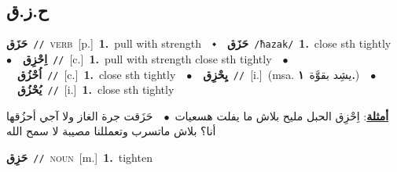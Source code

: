 \documentclass[10pt,a4paper,twoside]{article} %
\begin{document}
\begin{multicols}{2}
\vspace{-3mm}
\subsection*{\color{blue}\foreignlanguage{arabic}{ح.ز.ق}\color{blue}{}} 

{\setlength\topsep{0pt}\textbf{\foreignlanguage{arabic}{حَزَق}}\ {\color{gray}\texttt{//}\color{black}}\ \textsc{verb}\ [p.]\ \textbf{1.}~pull with strength\ \ $\smblkdiamond$\ \ \setlength\topsep{0pt}\textbf{\foreignlanguage{arabic}{حَزَق}}\ {\color{gray}\texttt{/ħazak/}\color{black}}\ \textbf{1.}~close sth tightly\ \ $\bullet$\ \ \setlength\topsep{0pt}\textbf{\foreignlanguage{arabic}{اِحْزِق}}\ {\color{gray}\texttt{//}\color{black}}\ [c.]\ \textbf{1.}~pull with strength close sth tightly\ \ $\bullet$\ \ \setlength\topsep{0pt}\textbf{\foreignlanguage{arabic}{اُحْزُق}}\ {\color{gray}\texttt{//}\color{black}}\ [c.]\ \textbf{1.}~close sth tightly\ \ $\bullet$\ \ \setlength\topsep{0pt}\textbf{\foreignlanguage{arabic}{يِحْزِق}}\ {\color{gray}\texttt{//}\color{black}}\ [i.]\ \color{gray}(msa. \foreignlanguage{arabic}{يشِد بقوَّة}~\foreignlanguage{arabic}{\textbf{١.}})\color{black}\ \ $\bullet$\ \ \setlength\topsep{0pt}\textbf{\foreignlanguage{arabic}{يُحْزُق}}\ {\color{gray}\texttt{//}\color{black}}\ [i.]\ \textbf{1.}~close sth tightly\  \begin{flushright}\color{gray}\foreignlanguage{arabic}{\textbf{\underline{\foreignlanguage{arabic}{أمثلة}}}: اِحْزِق الحبل مليح بلاش ما يفلت هسعيات\ $\bullet$\ \  حَزَقت جرة الغاز ولا آجي أحزُقها أنا؟ بلاش ماتسرب وتعمللنا مصيبة لا سمح الله}\end{flushright}\color{black}} \vspace{2mm}

{\setlength\topsep{0pt}\textbf{\foreignlanguage{arabic}{حَزِق}}\ {\color{gray}\texttt{//}\color{black}}\ \textsc{noun}\ [m.]\ \textbf{1.}~tighten\ } \vspace{2mm}


\end{multicols}
\end{document}
